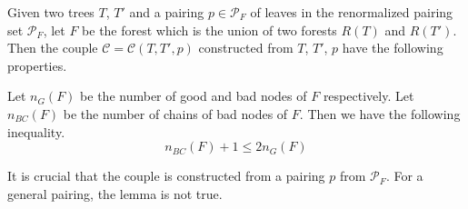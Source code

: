 \begin{lem}\label{eq.ineqn_BCn_G.fourwave} Given two trees $T$, $T'$ and a pairing $p\in\mathcal{P}_F$ of leaves in the renormalized pairing set $\mathcal{P}_F$, let $F$ be the forest which is the union of two forests $R(T)$ and $R(T')$. Then the couple $\mathcal{C} = \mathcal{C}(T,T',p)$ constructed from $T$, $T'$, $p$ have the following properties.


Let $n_{G}(F)$ be the number of good and bad nodes of $F$ respectively. Let $n_{BC}(F)$ be the number of chains of bad nodes of $F$. Then we have the following inequality.
\begin{equation}\label{eq.n_Bn_G.fourwave}
 n_{BC}(F) + 1 \le 2n_{G}(F)
\end{equation}
\end{lem}
\begin{rem}
It is crucial that the couple is constructed from a pairing $p$ from $\mathcal{P}_F$. For a general pairing, the lemma is not true.
\end{rem}
